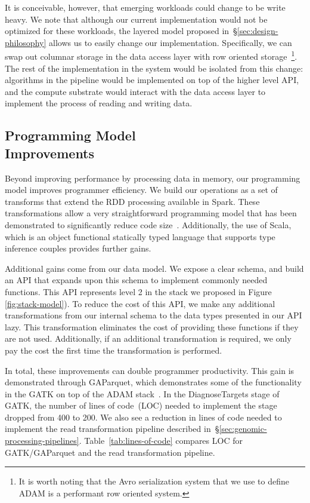 \documentclass[10pt,twocolumn]{article}
\theoremstyle{plain}
\begin{document}
It is conceivable, however, that emerging workloads could change to be write heavy. We note that although our current
implementation would not be optimized for these workloads, the layered model proposed in~\S\ref{sec:design-philosophy}
allows us to easily change our implementation. Specifically, we can swap out columnar storage in the data access layer with
row oriented storage~\footnote{It is worth noting that the Avro serialization system that we use to define ADAM is a performant
row oriented system.}. The rest of the implementation in the system would be isolated from this change: algorithms in the
pipeline would be implemented on top of the higher level API, and the compute substrate would interact with the data access
layer to implement the process of reading and writing data.

\subsection{Programming Model\\Improvements}
\label{sec:programming-model-improvements}

Beyond improving performance by processing data in memory, our programming model improves programmer efficiency.
We build our operations as a set of transforms that extend the RDD processing available in Spark. These transformations
allow a very straightforward programming model that has been demonstrated to significantly reduce code size~\cite{zaharia12}.
Additionally, the use of Scala, which is an object functional statically typed language that supports type inference couples
provides further gains.

Additional gains come from our data model. We expose a clear schema, and build an API that expands upon this schema
to implement commonly needed functions. This API represents level 2 in the stack we proposed in Figure \ref{fig:stack-model}). To reduce the cost of this API, we make any additional transformations from our
internal schema to the data types presented in our API lazy. This transformation eliminates the cost of providing these functions if they are
not used. Additionally, if an additional transformation is required, we only pay the cost the first time the transformation is performed.

In total, these improvements can double programmer productivity. This gain is demonstrated through
GAParquet, which demonstrates some of the functionality in the GATK on top of the ADAM stack~\cite{gaparquet}. In the
DiagnoseTargets stage of GATK, the number of lines of code~(LOC) needed to implement the stage dropped from 400 to
200. We also see a reduction in lines of code needed to implement the read transformation pipeline described
in~\S\ref{sec:genomic-processing-pipelines}. Table~\ref{tab:lines-of-code} compares LOC for GATK/GAParquet and the read transformation pipeline.
\end{document}
